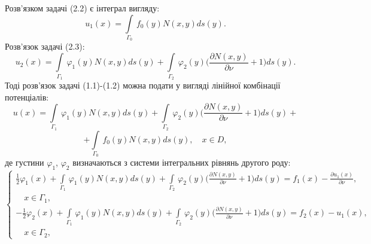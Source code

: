 \documentclass[a4 paper,12pt,ukrainian]{report}
\begin{document}
\hspace*{\parindent}Розв'язком задачі (2.2) є інтеграл вигляду:
\begin{equation}
u_{1}(x) = \int\limits_{\Gamma_{0}} \, f_{0}(y)N(x,y) ds(y). 
\end{equation}
\hspace*{\parindent}Розв'язок задачі (2.3):
\begin{equation}
u_{2}(x) = \int\limits_{\Gamma_{1}} \, \varphi_{1}(y)N(x,y)ds(y)+\int\limits_{\Gamma_{2}} \, \varphi_{2}(y)\bigg(\frac{\partial N(x,y)}{\partial\nu} + 1\bigg)ds(y). 
\end{equation}
\hspace*{\parindent}Тоді розв'язок задачі (1.1)-(1.2) можна подати у вигляді лінійної комбінації потенціалів:
\begin{equation}
u(x) = \int\limits_{\Gamma_{1}} \, \varphi_{1}(y)N(x,y)ds(y)+\int\limits_{\Gamma_{2}} \, \varphi_{2}(y)\bigg(\frac{\partial N(x,y)}{\partial\nu} + 1\bigg)ds(y)+
\end{equation}
\begin{equation*}
+\int\limits_{\Gamma_{0}} \, f_{0}(y)N(x,y) ds(y), \quad x \in D,
\end{equation*}
де густини $\varphi_{1}$, $\varphi_{2}$ визначаються з системи інтегральних рівнянь другого роду:
\begin{equation}\label{13}
 \left\{
\begin{array}{c}
   \displaystyle
\frac{1}{2}\varphi_{1}(x) + \int\limits_{\Gamma_1} \, \varphi_1(y)N(x,y)ds(y)+\int\limits_{\Gamma_2} \, \varphi_2(y)\bigg(\frac{\partial N(x,y)}{\partial\nu} + 1\bigg)ds(y)=f_1(x)-\frac{\partial u_{1}(x)}{\partial\nu},\\ \quad x\in \Gamma_1,\\

	\displaystyle
  -\frac{1}{2}\varphi_{2}(x) + \int\limits_{\Gamma_1} \, \varphi_1(y)N(x,y)ds(y)+\int\limits_{\Gamma_2} \, \varphi_2(y)\bigg(\frac{\partial N(x,y)}{\partial\nu} + 1\bigg)ds(y)=f_2(x)-u_{1}(x),\\ \quad x\in \Gamma_2,
 \end{array}
\right.
\end{equation}


\newpage
\end{document}
